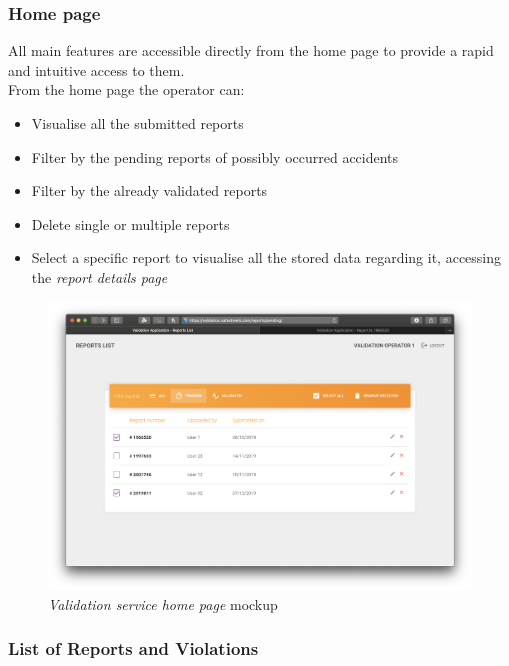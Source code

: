 \subsubsection{Home page} 
All main features are accessible directly from the home page to provide a rapid and intuitive access to them. \\
From the home page the operator can:
\begin{itemize}
	\item Visualise all the submitted reports
	\item Filter by the pending reports of possibly occurred accidents
	\item Filter by the already validated reports
	\item Delete single or multiple reports
	\item Select a specific report to visualise all the stored data regarding it, accessing the \emph{report details page}\newline\newline
\end{itemize}
 
 \begin{figure}[ht!]
 	\hspace*{-1cm}
			\centering
			\includegraphics[scale=0.3]{mockups/validationApp1.png}
			\caption{
				\label{fig:cc1} 
				\emph{Validation service home page} mockup
			}
		\end{figure}

		\clearpage
\subsubsection{List of Reports and Violations}

